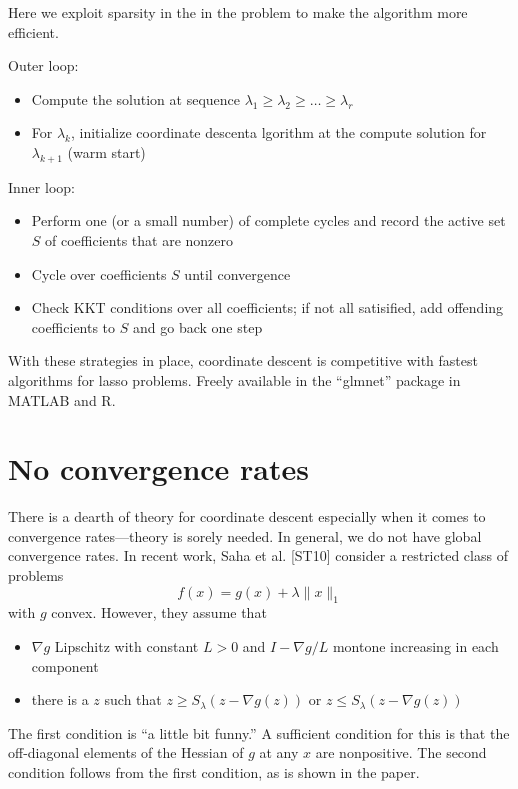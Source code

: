 \documentclass[twoside]{article}
\renewcommand{\cite}[1]{[#1]}
\begin{document}
Here we exploit sparsity in the in the problem to make the algorithm more efficient. 

Outer loop:
\begin{itemize}
\item Compute the solution at sequence $\lambda_1 \ge \lambda_2 \ge \ldots \ge \lambda_r$
\item For $\lambda_k$, initialize coordinate descenta lgorithm at the compute solution for $\lambda_{k+1}$ (warm start)
\end{itemize}

Inner loop:
\begin{itemize}
\item Perform one (or a small number) of complete cycles and record the active set $S$ of coefficients that are nonzero
\item Cycle over coefficients $S$ until convergence
\item Check KKT conditions over all coefficients; if not all satisified, add offending coefficients to $S$ and go back one step
\end{itemize}

With these strategies in place, coordinate descent is competitive with fastest algorithms for lasso problems. Freely available in the ``glmnet'' package in MATLAB and R.

\section{No convergence rates}

There is a dearth of theory for coordinate descent especially when it comes to convergence rates---theory is sorely needed. In general, we do not have global convergence rates. In recent work, Saha et al. \cite{ST10} consider a restricted class of problems
\begin{equation*}
f(x) = g(x) + \lambda \|x\|_1
\end{equation*}
with $g$ convex. However, they assume that
\begin{itemize}
\item $\nabla g$ Lipschitz with constant $L > 0$ and $I - \nabla g/L$ montone increasing in each component
\item there is a $z$ such that $z \ge S_\lambda(z - \nabla g(z))$ or $z \le S_\lambda(z - \nabla g(z))$
\end{itemize}
The first condition is ``a little bit funny.'' A sufficient condition for this is that the off-diagonal elements of the Hessian of $g$ at any $x$ are nonpositive. The second condition follows from the first condition, as is shown in the paper.
\end{document}
